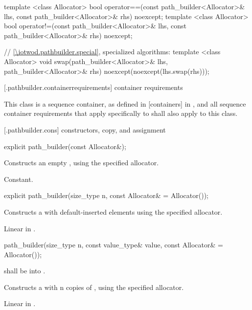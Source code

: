 \begin{codeblock}
{  template <class Allocator>
  bool operator==(const path_builder<Allocator>& lhs, 
    const path_builder<Allocator>& rhs) noexcept;
  template <class Allocator>
  bool operator!=(const path_builder<Allocator>& lhs, 
    const path_builder<Allocator>& rhs) noexcept;
  
  // \ref{\iotwod.pathbuilder.special}, specialized algorithms:
  template <class Allocator>
  void swap(path_builder<Allocator>& lhs, path_builder<Allocator>& rhs)
    noexcept(noexcept(lhs.swap(rhs)));
}
\end{codeblock}

 [\iotwod.pathbuilder.containerrequirements] { container requirements}

\pnum
This class is a sequence container, as defined in [containers] in \cppseventeen, and all sequence container requirements that apply specifically to  shall also apply to this class.

 [\iotwod.pathbuilder.cons] { constructors, copy, and assignment}

%
\begin{itemdecl}
explicit path_builder(const Allocator&);
\end{itemdecl}
\begin{itemdescr}
\pnum
\effects
Constructs an empty , using the specified allocator.

\pnum
\complexity
Constant.
\end{itemdescr}

%
\begin{itemdecl}
explicit path_builder(size_type n, const Allocator& = Allocator());
\end{itemdecl}
\begin{itemdescr}
\pnum
\effects
Constructs a  with  default-inserted elements using the specified allocator.

\pnum
\complexity
Linear in .
\end{itemdescr}

%
\begin{itemdecl}
path_builder(size_type n, const value_type& value,
  const Allocator& = Allocator());
\end{itemdecl}
\begin{itemdescr}
\pnum
\requires
{} shall be  into .

\pnum
\effects
Constructs a  with n copies of , using the specified allocator.

\pnum
\complexity
Linear in .
\end{itemdescr}

